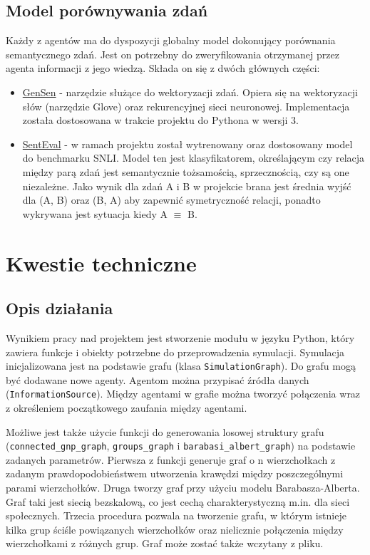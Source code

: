 \documentclass{article}
\begin{document}
	\subsection{Model porównywania zdań}
	Każdy z agentów ma do dyspozycji globalny model dokonujący porównania semantycznego zdań. Jest on potrzebny do zweryfikowania otrzymanej przez agenta informacji z jego wiedzą. Składa on się z dwóch głównych części:
	\begin{itemize}
		\item \href{https://github.com/Maluuba/gensen}{GenSen} - narzędzie służące do wektoryzacji zdań. Opiera się na wektoryzacji słów (narzędzie Glove) oraz rekurencyjnej sieci neuronowej. Implementacja została dostosowana w trakcie projektu do Pythona w wersji 3.
		\item \href{https://github.com/facebookresearch/SentEval}{SentEval} - w ramach projektu został wytrenowany oraz dostosowany model do benchmarku SNLI. Model ten jest klasyfikatorem, określającym czy relacja między parą zdań jest semantycznie tożsamością, sprzecznością, czy są one niezależne. Jako wynik dla zdań A i B w projekcie brana jest średnia wyjść dla (A, B) oraz (B, A) aby zapewnić symetryczność relacji, ponadto wykrywana jest sytuacja kiedy A $\equiv$ B.
	\end{itemize}

	\section{Kwestie techniczne}
	\subsection{Opis działania}
	Wynikiem pracy nad projektem jest stworzenie modułu w języku Python, który zawiera funkcje i obiekty potrzebne do przeprowadzenia symulacji. Symulacja inicjalizowana jest na podstawie grafu (klasa {\tt SimulationGraph}). Do grafu mogą być dodawane nowe agenty. Agentom można przypisać źródła danych ({\tt InformationSource}). Między agentami w grafie można tworzyć połączenia wraz z określeniem początkowego zaufania między agentami. 
	
	Możliwe jest także użycie funkcji do generowania losowej struktury grafu ({\tt connected\_gnp\_graph}, {\tt groups\_graph} i {\tt barabasi\_albert\_graph}) na podstawie zadanych parametrów. Pierwsza z funkcji generuje graf o n wierzchołkach z zadanym prawdopodobieństwem utworzenia krawędzi między poszczególnymi parami wierzchołków. Druga tworzy graf przy użyciu modelu Barabasza-Alberta. Graf taki jest siecią bezskalową, co jest cechą charakterystyczną m.in. dla sieci społecznych. Trzecia procedura pozwala na tworzenie grafu, w którym istnieje kilka grup ściśle powiązanych wierzchołków oraz nielicznie połączenia między wierzchołkami z różnych grup. Graf może zostać także wczytany z pliku. 
	
\end{document}
